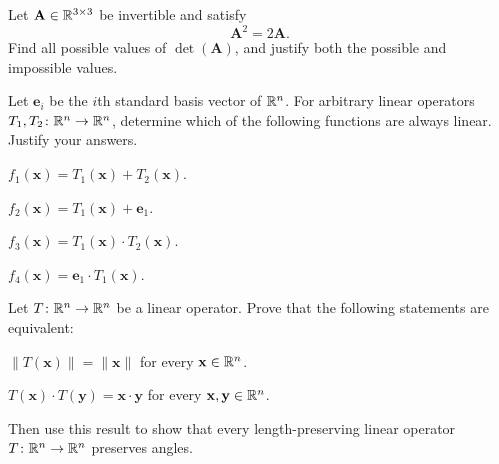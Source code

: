 \documentclass[11pt,oneside]{article}
\begin{document}
\begin{problem}
Let $\mathbf A\in\mathbb{R}^{3\times3}$ be invertible and satisfy
\[
\mathbf A^2=2\mathbf A.
\]
Find all possible values of $\det(\mathbf A)$, and justify both the possible and impossible values.
\end{problem}

\begin{problem}
Let $\mathbf e_i$ be the $i$th standard basis vector of $\mathbb{R}^n$. For arbitrary linear operators $T_1,T_2\colon\mathbb{R}^n\to\mathbb{R}^n$, determine which of the following functions are always linear. Justify your answers.
\begin{problemchoices}
\item $f_1(\mathbf x)=T_1(\mathbf x)+T_2(\mathbf x)$.
\item $f_2(\mathbf x)=T_1(\mathbf x)+\mathbf e_1$.
\item $f_3(\mathbf x)=T_1(\mathbf x)\cdot T_2(\mathbf x)$.
\item $f_4(\mathbf x)=\mathbf e_1\cdot T_1(\mathbf x)$.
\end{problemchoices}
\end{problem}

\begin{problem}
Let $T\colon\mathbb{R}^n\to\mathbb{R}^n$ be a linear operator. Prove that the following statements are equivalent:
\begin{problemclauses}
\item $\|T(\mathbf x)\|=\|\mathbf x\|$ for every $\mathbf x\in\mathbb{R}^n$.
\item $T(\mathbf x)\cdot T(\mathbf y)=\mathbf x\cdot\mathbf y$ for every $\mathbf x,\mathbf y\in\mathbb{R}^n$.
\end{problemclauses}
Then use this result to show that every length-preserving linear operator $T\colon\mathbb{R}^n\to\mathbb{R}^n$ preserves angles.
\end{problem}
\end{document}

